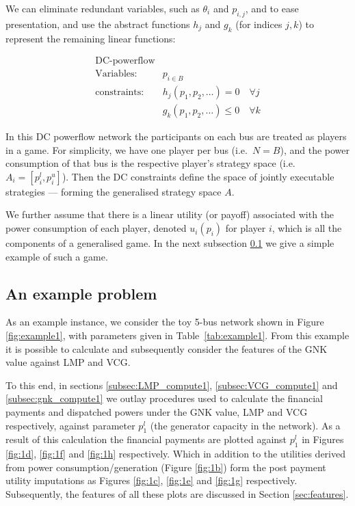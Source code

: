 We can eliminate redundant variables, such as $\theta_i$ and $p_{i,j}$, and to ease presentation, and use the abstract functions $h_j$ and $g_k$ (for indices $j,k$) to represent the remaining linear functions:

\begin{equation}
\label{dcopf2}
\begin{aligned}
\text{DC-powerflow}\\
\text{Variables:}\quad & p_{i\in B} \\
\text{constraints:}\quad & h_j(p_1,p_2,\dots)=0\quad \forall j\\
& g_k(p_1,p_2,\dots)\le 0 \quad \forall k
\end{aligned}
\end{equation}

In this DC powerflow network the participants on each bus are treated as players in a game.
For simplicity, we have one player per bus (i.e.~$N=B$), and the power consumption of that bus is the respective player's strategy space (i.e.\ $A_i=[p_i^l,p_i^u]$).
Then the DC constraints define the space of jointly executable strategies --- forming the generalised strategy space $A$.

We further assume that there is a linear utility (or payoff) associated with the power consumption of each player, denoted $u_i(p_i)$ for player $i$, which is all the components of a generalised game.
In the next subsection \ref{sec:example_network} we give a simple example of such a game.



\subsection{An example problem}\label{sec:example_network}

As an example instance, we consider the toy 5-bus network shown in Figure \ref{fig:example1}, with parameters given in Table~\ref{tab:example1}.
From this example it is possible to calculate and subsequently consider the features of the GNK value against LMP and VCG.

To this end, in sections \ref{subsec:LMP_compute1}, \ref{subsec:VCG_compute1} and \ref{subsec:gnk_compute1} we outlay procedures used to calculate the financial payments and dispatched powers under the GNK value, LMP and VCG respectively, against parameter $p_1^l$ (the generator capacity in the network).
As a result of this calculation the financial payments are plotted against $p_1^l$ in Figures \ref{fig:1d}, \ref{fig:1f} and \ref{fig:1h} respectively. Which in addition to the utilities derived from power consumption/generation (Figure \ref{fig:1b}) form the post payment utility imputations as Figures \ref{fig:1c}, \ref{fig:1e} and \ref{fig:1g} respectively.
Subsequently, the features of all these plots are discussed in Section \ref{sec:features}.


